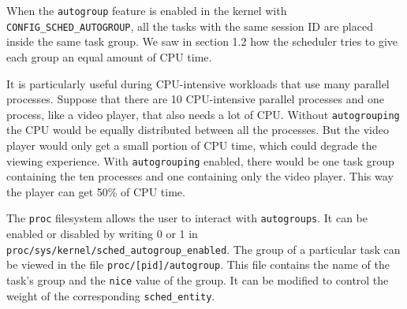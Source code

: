When the \verb|autogroup| feature is enabled in the kernel with \newline \verb|CONFIG_SCHED_AUTOGROUP|, all the tasks with the same session ID are placed inside the same task group. We saw in section 1.2 how the scheduler tries to give each group an equal amount of CPU time.

It is particularly useful during CPU-intensive workloads that use many parallel processes. Suppose that there are 10 CPU-intensive parallel processes and one process, like a video player, that also needs a lot of CPU. Without \verb|autogrouping| the CPU would be equally distributed between all the processes. But the video player would only get a small portion of CPU time, which could degrade the viewing experience. With \verb|autogrouping| enabled, there would be one task group containing the ten processes and one containing only the video player. This way the player can get 50\% of CPU time.

The \verb|proc| filesystem allows the user to interact with \verb|autogroups|. It can be enabled or disabled by writing 0 or 1 in \verb|proc/sys/kernel/sched_autogroup_enabled|.  The group of a particular task can be viewed in the file \verb|proc/[pid]/autogroup|. This file contains the name of the task's group and the \verb|nice| value of the group. It can be modified to control the weight of the corresponding \verb|sched_entity|.


